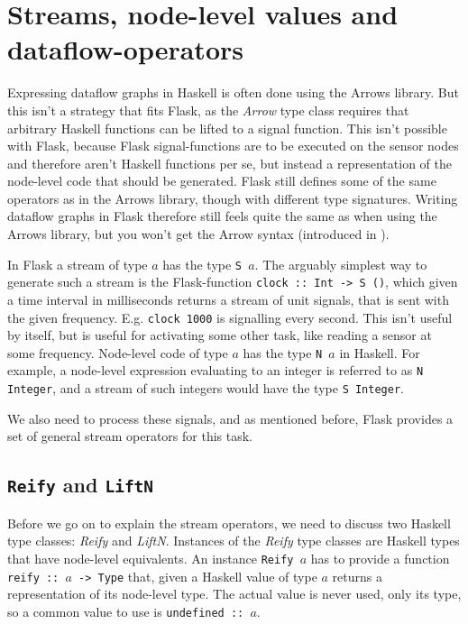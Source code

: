 \documentclass[a4paper, oneside, final]{memoir}
\begin{document}
\section{Streams, node-level values and dataflow-operators}
Expressing dataflow graphs in Haskell is often done using the Arrows
library. But this isn't a strategy that fits Flask, as the
\textit{Arrow} type class requires that arbitrary Haskell functions
can be lifted to a signal function. This isn't possible with Flask,
because Flask signal-functions are to be executed on the sensor nodes
and therefore aren't Haskell functions per se, but instead a
representation of the node-level code that should be generated. Flask
still defines some of the same operators as in the Arrows library,
though with different type signatures. Writing dataflow graphs in
Flask therefore still feels quite the same as when using the Arrows
library, but you won't get the Arrow syntax (introduced in
\cite{PatersonRA:notation}).

In Flask a stream of type $a$ has the type \texttt{S
  $a$}. The arguably simplest way to generate such a stream is
the Flask-function \texttt{clock :: Int -> S ()}, which given a time
interval in milliseconds returns a stream of unit signals, that is
sent with the given frequency. E.g. \texttt{clock 1000} is signalling
every second. This isn't useful by itself, but is useful for
activating some other task, like reading a sensor at some frequency.
Node-level code of type $a$ has the type \texttt{N $a$} in Haskell.  For
example, a node-level expression evaluating to an integer is referred
to as \texttt{N Integer}, and a stream of such integers would have the type
\texttt{S Integer}.

We also need to process these signals, and as mentioned before, Flask
provides a set of general stream operators for this task.


\subsection{\texttt{Reify} and \texttt{LiftN}}
Before we go on to explain the stream operators, we need to discuss
two Haskell type classes: \textit{Reify} and \textit{LiftN}.
Instances of the \textit{Reify} type classes are Haskell types that
have node-level equivalents. An instance \texttt{Reify $a$} has to
provide a function \texttt{reify :: $a$ -> Type} that, given a Haskell
value of type $a$ returns a representation of its node-level type.
The actual value is never used, only its type, so a common value to
use is \texttt{undefined :: $a$}. \hfill
\end{document}
